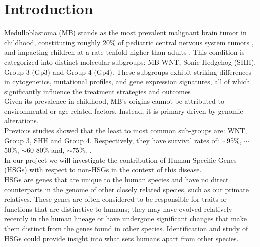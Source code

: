 \documentclass[10pt]{SelfArx} %
\begin{document}
\maketitle %



\section*{Introduction}\label{sec:introduction}
Medulloblastoma (MB) stands as the most prevalent malignant brain tumor in childhood, constituting roughly 20\% of pediatric central nervous system tumors \cite{kumar2017challenges}, and impacting children at a rate tenfold higher than adults \cite{carta2020cancer}. This condition is categorized into distinct molecular subgroups: MB-WNT, Sonic Hedgehog (SHH), Group 3 (Gp3) and Group 4 (Gp4). These subgroups exhibit striking differences in cytogenetics, mutational profiles, and gene expression signatures, all of which significantly influence the treatment strategies and outcomes \cite{chen2022molecular}. \\
Given its prevalence in childhood, MB's origins cannot be attributed to environmental or age-related factors. Instead, it is primary driven by genomic alterations. \\
Previous studies showed that the least to most common sub-groups are: WNT, Group 3, SHH and Group 4. Respectively, they have survival rates of: $\sim$95\%, $\sim$50\%, $\sim$60-80\% and, $\sim$75\%. \cite{northcott2012medulloblastomics, hovestadt2020medulloblastomics}.\\
In our project we will investigate the contribution of Human Specific Genes (HSGs) with respect to non-HSGs in the context of this disease. \\
HSGs are genes that are unique to the human species and have no direct counterparts in the genome of other closely related species, such as our primate relatives. These genes are often considered to be responsible for traits or functions that are distinctive to humans; they may have evolved relatively recently in the human lineage or have undergone significant changes that make them distinct from the genes found in other species. Identification and study of HSGs could provide insight into what sets humans apart from other species. \\ 
\end{document}
